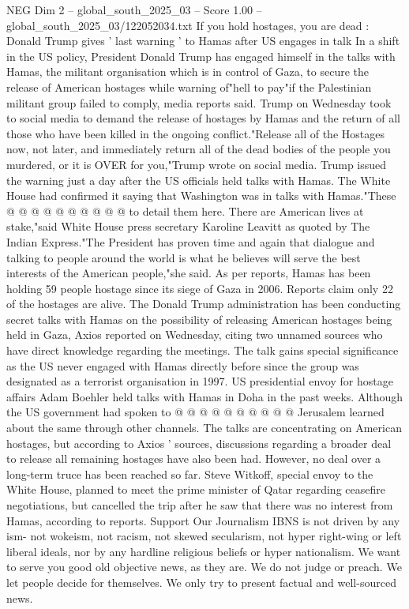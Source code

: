\begin{textsample}{NEG Dim 2 – global\_south\_2025\_03 – Score 1.00 – global\_south\_2025\_03/122052034.txt}  \label{ex:f2_neg_143}
If you hold hostages, you are dead : Donald Trump gives ' last warning ' to Hamas after US engages in talk In a shift in the US policy, President Donald Trump has engaged himself in the talks with Hamas, the militant organisation which is in control of Gaza, to secure the release of American hostages while warning of"hell to pay"if the Palestinian militant group failed to comply, media reports said.
Trump on Wednesday took to social media to demand the release of hostages by Hamas and the return of all those who have been killed in the ongoing conflict."Release all of the Hostages now, not later, and immediately return all of the dead bodies of the people you murdered, or it is OVER for you,"Trump wrote on social media.
Trump issued the warning just a day after the US officials held talks with Hamas.
The White House had confirmed it saying that Washington was in talks with Hamas."These @ @ @ @ @ @ @ @ @ @ to detail them here.
There are American lives at stake,"said White House press secretary Karoline Leavitt as quoted by The Indian Express."The President has proven time and again that dialogue and talking to people around the world is what he believes will serve the best interests of the American people,"she said.
As per reports, Hamas has been holding 59 people hostage since its siege of Gaza in 2006.
Reports claim only 22 of the hostages are alive.
The Donald Trump administration has been conducting secret talks with Hamas on the possibility of releasing American hostages being held in Gaza, Axios reported on Wednesday, citing two unnamed sources who have direct knowledge regarding the meetings.
The talk gains special significance as the US never engaged with Hamas directly before since the group was designated as a terrorist organisation in 1997.
US presidential envoy for hostage affairs Adam Boehler held talks with Hamas in Doha in the past weeks.
Although the US government had spoken to @ @ @ @ @ @ @ @ @ @ Jerusalem learned about the same through other channels.
The talks are concentrating on American hostages, but according to Axios ' sources, discussions regarding a broader deal to release all remaining hostages have also been had.
However, no deal over a long-term truce has been reached so far.
Steve Witkoff, special envoy to the White House, planned to meet the prime minister of Qatar regarding ceasefire negotiations, but cancelled the trip after he saw that there was no interest from Hamas, according to reports.
Support Our Journalism IBNS is not driven by any ism- not wokeism, not racism, not skewed secularism, not hyper right-wing or left liberal ideals, nor by any hardline religious beliefs or hyper nationalism.
We want to serve you good old objective news, as they are.
We do not judge or preach.
We let people decide for themselves.
We only try to present factual and well-sourced news.

\end{textsample}

